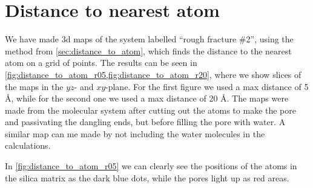 \section{Distance to nearest atom}

We have made 3d maps of the system labelled ``rough fracture \#2'', using the method from \cref{sec:distance_to_atom}, which finds the distance to the nearest atom on a grid of points. The results can be seen in \cref{fig:distance_to_atom_r05,fig:distance_to_atom_r20}, where we show slices of the maps in the $yz$- and $xy$-plane. For the first figure we used a max distance of 5 \AA, while for the second one we used a max distance of 20 \AA. The maps were made from the molecular system after cutting out the atoms to make the pore and passivating the dangling ends, but before filling the pore with water. A similar map can me made by not including the water molecules in the calculations.

In \cref{fig:distance_to_atom_r05} we can clearly see the positions of the atoms in the silica matrix as the dark blue dots, while the pores light up as red areas.

